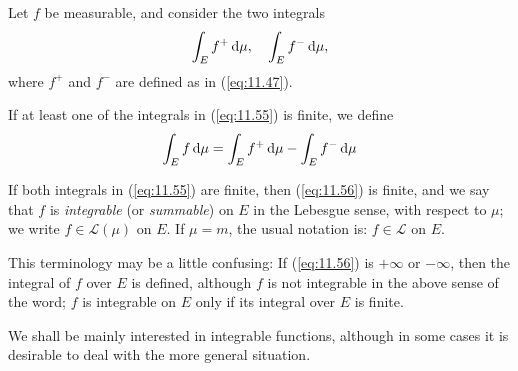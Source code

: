 \begin{mydef}
    \label{mydef:11.22}
    Let $f$ be measurable, and consider the two integrals
    \begin{equation}
        \label{eq:11.55}
        \int_E f^+ \d \mu , \quad
        \int_E f^- \d \mu ,
    \end{equation}
    where $f^+$ and $f^-$ are defined as in (\ref{eq:11.47}).

    If at least one of the integrals in (\ref{eq:11.55}) is finite,
    we define
    \begin{equation}
        \label{eq:11.56}
        \int_E f \d \mu =
        \int_E f^+ \d \mu -
        \int_E f^- \d \mu
    \end{equation}

    If both integrals in (\ref{eq:11.55}) are finite, then (\ref{eq:11.56}) is finite,
    and we say that $f$ is \emph{integrable} (or \emph{summable}) on $E$ in the Lebesgue sense, with respect to $\mu$;
    we write $f \in \mathscr{L}(\mu)$ on $E$.
    If $\mu = m$, the usual notation is:
    $f \in \mathscr{L}$ on $E$.

    This terminology may be a little confusing:
    If (\ref{eq:11.56}) is $+\infty$ or $-\infty$,
    then the integral of $f$ over $E$ is defined,
    although $f$ is not integrable in the above sense of the word;
    $f$ is integrable on $E$ only if its integral over $E$ is finite.

    We shall be mainly interested in integrable functions,
    although in some cases it is desirable to deal with the more general situation.
\end{mydef}

